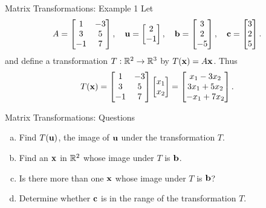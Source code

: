 \begin{frame}{Matrix Transformations: Example 1}
Let
\[
A=\begin{bmatrix}1&-3\\3&5\\-1&7\end{bmatrix},\quad
\mathbf{u}=\begin{bmatrix}2\\-1\end{bmatrix},\quad
\mathbf{b}=\begin{bmatrix}3\\2\\-5\end{bmatrix},\quad
\mathbf{c}=\begin{bmatrix}3\\2\\5\end{bmatrix}.
\]
and define a transformation $T:\mathbb{R}^2\to\mathbb{R}^3$ by $T(\mathbf{x})=A\mathbf{x}$. Thus
\[
T(\mathbf{x})=\begin{bmatrix}1&-3\\3&5\\-1&7\end{bmatrix}
\begin{bmatrix}x_1\\x_2\end{bmatrix}
=\begin{bmatrix}x_1-3x_2\\3x_1+5x_2\\-x_1+7x_2\end{bmatrix}.
\]
\end{frame}

\begin{frame}{Matrix Transformations: Questions}
\begin{enumerate}[a.]
\item Find $T(\mathbf{u})$, the image of $\mathbf{u}$ under the transformation $T$.
\item Find an $\mathbf{x}$ in $\mathbb{R}^2$ whose image under $T$ is $\mathbf{b}$.
\item Is there more than one $\mathbf{x}$ whose image under $T$ is $\mathbf{b}$?
\item Determine whether $\mathbf{c}$ is in the range of the transformation $T$.
\end{enumerate}
\end{frame}

